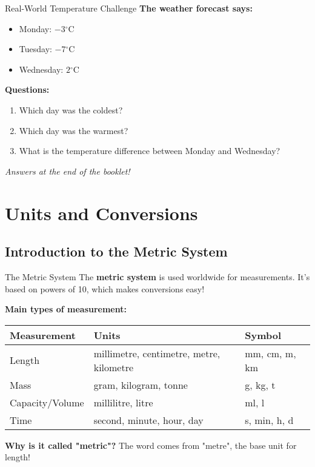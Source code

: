 \documentclass[12pt,a4paper]{article}
\newcommand{\degC}{$^\circ$C}
\begin{document}
\begin{challengebox}{Real-World Temperature Challenge}
\textbf{The weather forecast says:}
\begin{itemize}
\item Monday: $-3$\degC
\item Tuesday: $-7$\degC
\item Wednesday: $2$\degC
\end{itemize}

\textbf{Questions:}
\begin{enumerate}[label=\alph*)]
\item Which day was the coldest?
\item Which day was the warmest?
\item What is the temperature difference between Monday and Wednesday?
\end{enumerate}

\textit{Answers at the end of the booklet!}
\end{challengebox}

\newpage

\section{Units and Conversions}

\subsection{Introduction to the Metric System}

\begin{conceptbox}{The Metric System}
The \textbf{metric system} is used worldwide for measurements. It's based on powers of 10, which makes conversions easy!

\textbf{Main types of measurement:}
\begin{center}
\begin{tabular}{lll}
\toprule
\textbf{Measurement} & \textbf{Units} & \textbf{Symbol} \\
\midrule
Length & millimetre, centimetre, metre, kilometre & mm, cm, m, km \\
Mass & gram, kilogram, tonne & g, kg, t \\
Capacity/Volume & millilitre, litre & ml, l \\
Time & second, minute, hour, day & s, min, h, d \\
\bottomrule
\end{tabular}
\end{center}

\textbf{Why is it called "metric"?} The word comes from "metre", the base unit for length!
\end{conceptbox}
\end{document}
